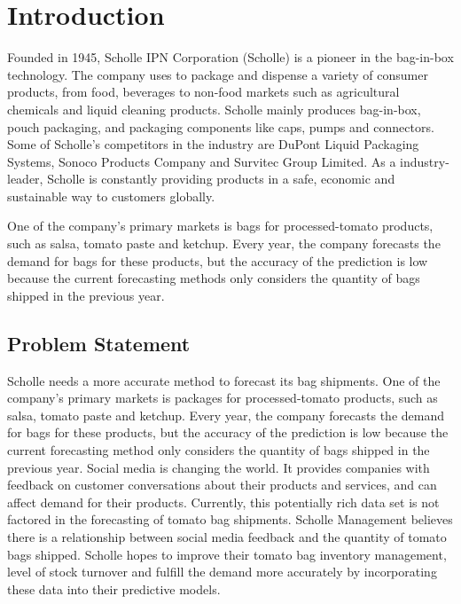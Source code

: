 \documentclass[12pt,oneside]{chicagocapstone}
\begin{document}
  \hypersetup{linkcolor=black}
  \setcounter{tocdepth}{2}
  \tableofcontents

  \listoffigures

  \listoftables


\mainmatter %
\pagestyle{fancyplain} %

\chapter*{Introduction}\label{introduction}

Founded in 1945, Scholle IPN Corporation (Scholle) is a pioneer in the
bag-in-box technology. The company uses to package and dispense a
variety of consumer products, from food, beverages to non-food markets
such as agricultural chemicals and liquid cleaning products. Scholle
mainly produces bag-in-box, pouch packaging, and packaging components
like caps, pumps and connectors. Some of Scholle's competitors in the
industry are DuPont Liquid Packaging Systems, Sonoco Products Company
and Survitec Group Limited. As a industry-leader, Scholle is constantly
providing products in a safe, economic and sustainable way to customers
globally.

One of the company's primary markets is bags for processed-tomato
products, such as salsa, tomato paste and ketchup. Every year, the
company forecasts the demand for bags for these products, but the
accuracy of the prediction is low because the current forecasting
methods only considers the quantity of bags shipped in the previous
year.

\section*{Problem Statement}\label{problem_statement}

Scholle needs a more accurate method to forecast its bag shipments. One
of the company's primary markets is packages for processed-tomato
products, such as salsa, tomato paste and ketchup. Every year, the
company forecasts the demand for bags for these products, but the
accuracy of the prediction is low because the current forecasting method
only considers the quantity of bags shipped in the previous year. Social
media is changing the world. It provides companies with feedback on
customer conversations about their products and services, and can affect
demand for their products. Currently, this potentially rich data set is
not factored in the forecasting of tomato bag shipments. Scholle
Management believes there is a relationship between social media
feedback and the quantity of tomato bags shipped. Scholle hopes to
improve their tomato bag inventory management, level of stock turnover
and fulfill the demand more accurately by incorporating these data into
their predictive models.
\end{document}
